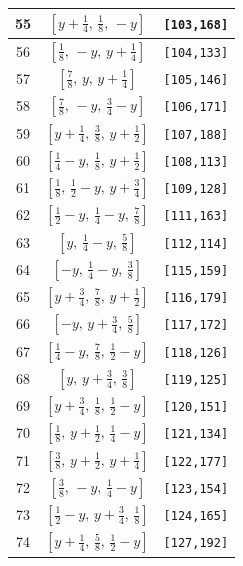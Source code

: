 \documentclass[fleqn,8pt]{jsarticle}
\begin{document}
\begin{longtable}{ccc}
55 & $\left[ y + \frac{1}{4},\, \frac{1}{8},\, - y \right]$ & {\tt [103,168]} \\ \hline
56 & $\left[ \frac{1}{8},\, - y,\, y + \frac{1}{4} \right]$ & {\tt [104,133]} \\ \hline
57 & $\left[ \frac{7}{8},\, y,\, y + \frac{1}{4} \right]$ & {\tt [105,146]} \\ \hline
58 & $\left[ \frac{7}{8},\, - y,\, \frac{3}{4} - y \right]$ & {\tt [106,171]} \\ \hline
59 & $\left[ y + \frac{1}{4},\, \frac{3}{8},\, y + \frac{1}{2} \right]$ & {\tt [107,188]} \\ \hline
60 & $\left[ \frac{1}{4} - y,\, \frac{1}{8},\, y + \frac{1}{2} \right]$ & {\tt [108,113]} \\ \hline
61 & $\left[ \frac{1}{8},\, \frac{1}{2} - y,\, y + \frac{3}{4} \right]$ & {\tt [109,128]} \\ \hline
62 & $\left[ \frac{1}{2} - y,\, \frac{1}{4} - y,\, \frac{7}{8} \right]$ & {\tt [111,163]} \\ \hline
63 & $\left[ y,\, \frac{1}{4} - y,\, \frac{5}{8} \right]$ & {\tt [112,114]} \\ \hline
64 & $\left[ - y,\, \frac{1}{4} - y,\, \frac{3}{8} \right]$ & {\tt [115,159]} \\ \hline
65 & $\left[ y + \frac{3}{4},\, \frac{7}{8},\, y + \frac{1}{2} \right]$ & {\tt [116,179]} \\ \hline
66 & $\left[ - y,\, y + \frac{3}{4},\, \frac{5}{8} \right]$ & {\tt [117,172]} \\ \hline
67 & $\left[ \frac{1}{4} - y,\, \frac{7}{8},\, \frac{1}{2} - y \right]$ & {\tt [118,126]} \\ \hline
68 & $\left[ y,\, y + \frac{3}{4},\, \frac{3}{8} \right]$ & {\tt [119,125]} \\ \hline
69 & $\left[ y + \frac{3}{4},\, \frac{1}{8},\, \frac{1}{2} - y \right]$ & {\tt [120,151]} \\ \hline
70 & $\left[ \frac{1}{8},\, y + \frac{1}{2},\, \frac{1}{4} - y \right]$ & {\tt [121,134]} \\ \hline
71 & $\left[ \frac{3}{8},\, y + \frac{1}{2},\, y + \frac{1}{4} \right]$ & {\tt [122,177]} \\ \hline
72 & $\left[ \frac{3}{8},\, - y,\, \frac{1}{4} - y \right]$ & {\tt [123,154]} \\ \hline
73 & $\left[ \frac{1}{2} - y,\, y + \frac{3}{4},\, \frac{1}{8} \right]$ & {\tt [124,165]} \\ \hline
74 & $\left[ y + \frac{1}{4},\, \frac{5}{8},\, \frac{1}{2} - y \right]$ & {\tt [127,192]} \\ \hline

\end{longtable}
\end{document}
